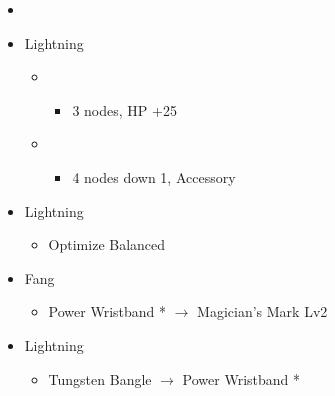 	\begin{menu}
		\begin{itemize}
			\paradigm
			\begin{itemize}
				\item {}%
				      {\paradigmline[1]{\textit{\com}}{\textit{\com}}{\textit{\rav}}}
				      {\paradigmline{\rav}{\com}{\rav}}%
				      {\paradigmline{\rav}{\sab}{\rav}}%
				      {\paradigmline{\rav}{\sen}{\rav}}%
				      {\paradigmline{(\com)}{(\com)}{\syn}}%
				      {\paradigmline{(\com)}{\com}{(\med)}}
			\end{itemize}
			\crystarium
			\begin{itemize}
				\item Lightning
				      \begin{itemize}
					      \item \com
					            \begin{itemize}
						            \item 3 nodes, HP +25
					            \end{itemize}
					      \item \med
					            \begin{itemize}
						            \item 4 nodes down 1, Accessory
					            \end{itemize}
				      \end{itemize}
			\end{itemize}
			\equip
			\begin{itemize}
				\item Lightning
				      \begin{itemize}
					      \item Optimize Balanced
				      \end{itemize}
				\item Fang
				      \begin{itemize}
					      \item Power Wristband * $\rightarrow$ Magician's Mark Lv2
				      \end{itemize}
				\item Lightning
				      \begin{itemize}
					      \item Tungsten Bangle $\rightarrow$ Power Wristband *
				      \end{itemize}
			\end{itemize}
		\end{itemize}
	\end{menu}

